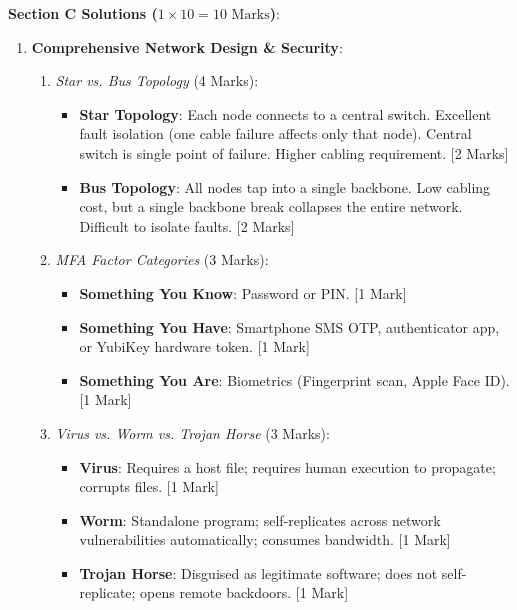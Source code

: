 \begin{solutionbox}
\medskip
\noindent\textbf{Section C Solutions ($1 \times 10 = 10\text{ Marks}$)}:
\begin{enumerate}[start=8]
    \item \textbf{Comprehensive Network Design \& Security}:
    \begin{enumerate}[label=(\alph*)]
        \item \textit{Star vs. Bus Topology} (4 Marks):
        \begin{itemize}
            \item \textbf{Star Topology}: Each node connects to a central switch. Excellent fault isolation (one cable failure affects only that node). Central switch is single point of failure. Higher cabling requirement. [2 Marks]
            \item \textbf{Bus Topology}: All nodes tap into a single backbone. Low cabling cost, but a single backbone break collapses the entire network. Difficult to isolate faults. [2 Marks]
        \end{itemize}

        \item \textit{MFA Factor Categories} (3 Marks):
        \begin{itemize}
            \item \textbf{Something You Know}: Password or PIN. [1 Mark]
            \item \textbf{Something You Have}: Smartphone SMS OTP, authenticator app, or YubiKey hardware token. [1 Mark]
            \item \textbf{Something You Are}: Biometrics (Fingerprint scan, Apple Face ID). [1 Mark]
        \end{itemize}

        \item \textit{Virus vs. Worm vs. Trojan Horse} (3 Marks):
        \begin{itemize}
            \item \textbf{Virus}: Requires a host file; requires human execution to propagate; corrupts files. [1 Mark]
            \item \textbf{Worm}: Standalone program; self-replicates across network vulnerabilities automatically; consumes bandwidth. [1 Mark]
            \item \textbf{Trojan Horse}: Disguised as legitimate software; does not self-replicate; opens remote backdoors. [1 Mark]
        \end{itemize}
    \end{enumerate}
\end{enumerate}
\end{solutionbox}
